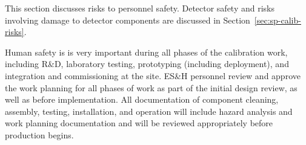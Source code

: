 

This section discusses risks to personnel safety. Detector safety and risks involving damage to detector components are discussed in Section~\ref{sec:sp-calib-risks}.

Human safety is %
is very important during all phases of the calibration work, including R\&D, laboratory testing, prototyping (including  deployment), and integration and commissioning at the   site.  ES\&H personnel review and approve the work planning for all phases of work as part of the initial design review, as well as before implementation. All documentation of component cleaning, assembly, testing, installation, and operation will include hazard analysis and work planning documentation and will be reviewed appropriately before production begins.

